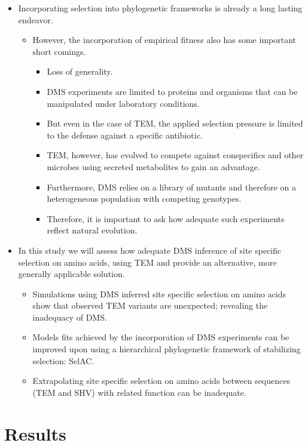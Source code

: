 \documentclass[12pt]{article}
\begin{document}
\begin{itemize}
	\item Incorporating selection into phylogenetic frameworks is already a long lasting endeavor.
	\begin{itemize}
		\item However, the incorporation of empirical fitness also has some important short comings.
		\begin{itemize}
			\item Loss of generality.
			\item DMS experiments are limited to proteins and organisms that can be manipulated under laboratory conditions.
			\item But even in the case of TEM, the applied selection pressure is limited to the defense against a specific antibiotic.
			\item TEM, however, has evolved to compete against conspecifics and other microbes using secreted metabolites to gain an advantage.
			\item Furthermore, DMS relies on a library of mutants and therefore on a heterogeneous population with competing genotypes.
			\item Therefore, it is important to ask how adequate such experiments reflect natural evolution. 
		\end{itemize}
	\end{itemize}
	\item In this study we will assess how adequate DMS inference of site specific selection on amino acids, using TEM and provide an alternative, more generally applicable solution.
	\begin{itemize}
		\item Simulations using DMS inferred site specific selection on amino acids show that observed TEM variants are unexpected; revealing the inadequacy of DMS.
		\item Models fits achieved by the incorporation of DMS experiments can be improved upon using a hierarchical phylogenetic framework of stabilizing selection: SelAC.
		\item Extrapolating site specific selection on amino acids between sequences (TEM and SHV) with related function can be inadequate.
	\end{itemize}
\end{itemize}

\section*{Results}
\end{document}
